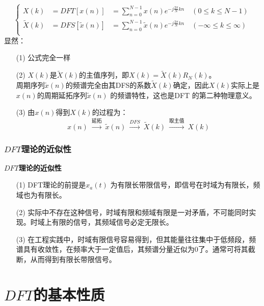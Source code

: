 \documentclass[notheorems,compress,mathserif,table]{beamer}
\begin{document}
\begin{frame}[shrink]\frametitle{}%
\begin{equation*}
    \left\{ \begin{aligned}
    X(k)         &=DFT[x(n)]        &= \sum_{n=0}^{N-1}x(n) e^{-j\frac{2\pi}{N}kn} \quad (0 \leq k \leq N-1) \\
    \tilde{X}(k) &=DFS[\tilde{x}(n)]&= \sum_{n=0}^{N-1}\tilde{x}(n) e^{-j\frac{2\pi}{N}kn} \quad (-\infty \leq k \leq \infty) \\
    \end{aligned} \right.
\end{equation*}
显然：
\begin{enumerate}
  \item [(1)]  公式完全一样
  \item [(2)]  $X(k)$是$\tilde{X}(k)$的主值序列，即$X(k)=\tilde{X}(k)R_N(k)$。\\
                    周期序列$\tilde{x}(n)$的频谱完全由其DFS的系数$\tilde{X}(k)$确定，因此$X(k)$实际上是$x(n)$的周期延拓序列$\tilde{x}(n)$ 的频谱特性，这也是DFT 的第二种物理意义。
  \item[(3)]   由$x(n)$得到$X(k)$的过程为：
                   $$x(n)\: \stackrel{\mbox{延拓}}{\longrightarrow}\:  \tilde{x}(n)  \: \stackrel{DFS}{\longrightarrow}\: \tilde{X}(k)    \: \stackrel{\mbox{取主值}}{\longrightarrow}\:X(k)$$
\end{enumerate}
\end{frame}


\begin{frame}[shrink]\frametitle{$DFT$理论的近似性}%
\textbf{$DFT$理论的近似性}
\begin{enumerate}
  \item [(1)]DFT理论的前提是$x_a(t)$ 为有限长带限信号，即信号在时域为有限长，频域也为有限长。
  \item [(2)]实际中不存在这种信号，时域有限和频域有限是一对矛盾，不可能同时实现。时域上有限的信号，其频域信号必定无限长。
  \item [(3)]在工程实践中，时域有限信号容易得到，但其能量往往集中于低频段，频谱具有收敛性，在频率大于一定值后，其频谱分量近似为0了。通常可将其截断，从而得到有限长带限信号。
\end{enumerate}
\end{frame}

\section{$DFT$的基本性质}
\end{document}
